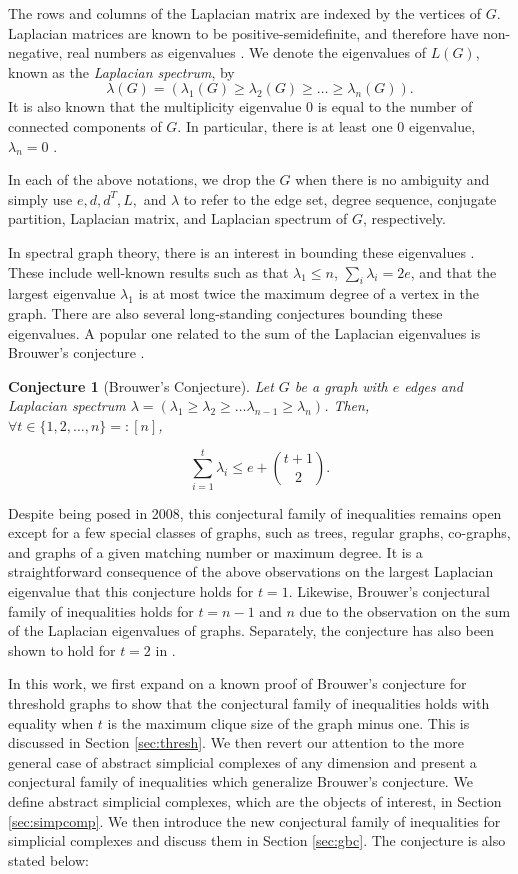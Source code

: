 \documentclass[11pt]{article}
\newtheorem{conj}[lm]{Conjecture}
\begin{document}
The rows and columns of the Laplacian matrix are indexed by the vertices of $G$.
Laplacian matrices are known to be positive-semidefinite, and therefore have non-negative, real numbers as eigenvalues \cite{BH}. We denote the eigenvalues of $L(G)$, known as the \emph{Laplacian spectrum}, by
\[ \lambda(G)= \left( \lambda_1(G) \geq \lambda_2 (G) \geq \ldots \geq \lambda_n (G) \right).\]
It is also known that the multiplicity eigenvalue $0$ is equal to the number of connected components of $G$. In particular, there is at least one $0$ eigenvalue, $\lambda_n=0$ .

In each of the above notations, we drop the $G$ when there is no ambiguity and simply use $e, d, d^T, L,$ and $\lambda$ to refer to the edge set, degree sequence, conjugate partition, Laplacian matrix, and Laplacian spectrum of $G$, respectively.

In spectral graph theory, there is an interest in bounding these eigenvalues \cite{BH,Merris,S,Z}. These include well-known results such as that $\lambda_1 \leq n$, $\sum_i \lambda_i = 2e$, and that the largest eigenvalue $\lambda_1$ is at most twice the maximum degree of a vertex in the graph. There are also several long-standing conjectures bounding these eigenvalues. A popular one related to the sum of the Laplacian eigenvalues is Brouwer's conjecture \cite{BH}.

\begin{conj}[Brouwer's Conjecture]
\label{bc}
Let $G$ be a graph with $e$ edges and Laplacian spectrum $\lambda = \left( \lambda_1 \geq \lambda_2 \geq \ldots \lambda_{n-1} \geq \lambda_n \right)$. Then, $\forall t \in \{1, 2, \ldots, n\} =: [n]$,

\[ \sum_{i=1}^{t} \lambda_i \leq e + \binom{t+1}{2}.\]
\end{conj}


Despite being posed in 2008, this conjectural family of inequalities remains open except for a few special classes of graphs, such as trees, regular graphs, co-graphs, and graphs of a given matching number or maximum degree. It is a straightforward consequence of the above observations on the largest Laplacian eigenvalue that this conjecture holds for $t = 1$. Likewise, Brouwer's conjectural family of inequalities holds for $t = n-1$ and $n$ due to the observation on the sum of the Laplacian eigenvalues of graphs. Separately, the conjecture has also been shown to hold for $t = 2$ in \cite{H}.

In this work, we first expand on a known proof of Brouwer's conjecture for threshold graphs to show that the conjectural family of inequalities holds with equality when $t$ is the maximum clique size of the graph minus one. This is discussed in Section \ref{sec:thresh}. We then revert our attention to the more general case of abstract simplicial complexes of any dimension and present a conjectural family of inequalities which generalize Brouwer's conjecture. We define abstract simplicial complexes, which are the objects of interest, in Section \ref{sec:simpcomp}. We then introduce the new conjectural family of inequalities for simplicial complexes and discuss them in Section \ref{sec:gbc}. The conjecture is also stated below:
\end{document}
